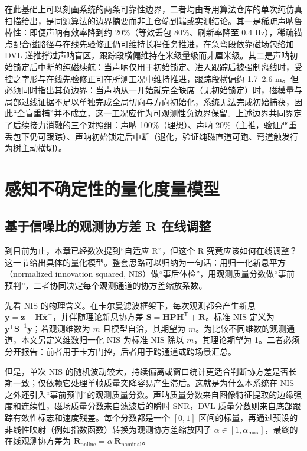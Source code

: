 在此基础上可以刻画系统的两条可靠性边界，二者均由专用算法仓库的单次纯仿真扫描给出，是同源算法的边界摘要而非主仓端到端或实测结论。其一是稀疏声呐鲁棒性：即便声呐有效率降到约 20\%（等效丢包 80\%、刷新率降至 0.4 Hz），稀疏锚点配合磁路径与在线先验修正仍可维持长程任务推进，在急弯段依靠磁场包络加 DVL 递推撑过声呐盲区，跟踪段横偏维持在米级量级而非厘米级。其二是声呐初始锁定后中断的纯磁续航：当声呐仅用于初始锁定、进入跟踪后被强制离线时，受控之字形与在线先验修正可在所测工况中维持推进，跟踪段横偏约 1.7--2.6 m。但必须同时指出其负边界：当声呐从一开始就完全缺席（无初始锁定）时，磁模量与局部过线证据不足以单独完成全局切向与方向初始化，系统无法完成初始捕获，因此``全盲重捕''并不成立，这一工况应作为可观测性负边界保留。上述边界共同界定了后续接力消融的三个对照组：声呐 100\%（理想）、声呐 20\%（主推，验证严重丢包下仍可跟踪）、声呐初始锁定后中断（退化，验证纯磁直道可跑、弯道触发行为树主动横切）。

\section{感知不确定性的量化度量模型}\label{sec:ch03-3-4}

\subsection{基于信噪比的观测协方差 R 在线调整}\label{sec:ch03-3-4-1}

到目前为止，本章已经数次提到``自适应 R''，但这个 R 究竟应该如何在线调整？这一节给出具体的量化模型。整套思路可以归纳为一句话：用归一化新息平方（normalized innovation squared, NIS）做``事后体检''，用观测质量分数做``事前预判''，二者协同决定每个观测通道的协方差缩放系数。

先看 NIS 的物理含义\cite{barshalom2001estimation}。在卡尔曼滤波框架下，每次观测都会产生新息 \(\boldsymbol{y}=\boldsymbol{z}-\boldsymbol{H}\hat{\boldsymbol{x}}^-\)，并伴随理论新息协方差 \(\boldsymbol{S}=\boldsymbol{H}\boldsymbol{P}\boldsymbol{H}^{\mathsf{T}}+\boldsymbol{R}\)。标准 NIS 定义为 \(\boldsymbol{y}^{\mathsf{T}}\boldsymbol{S}^{-1}\boldsymbol{y}\)；若观测维数为 \(m\) 且模型自洽，其期望为 \(m\)。为比较不同维数的观测通道，本文另定义维数归一化 NIS 为标准 NIS 除以 \(m\)，其理论期望为 1。二者必须分开报告：前者用于卡方门控，后者用于跨通道或跨场景汇总。

但是，单次 NIS 的随机波动较大，持续偏离或窗口统计更适合判断协方差是否长期一致；仅依赖它处理单帧质量突降容易产生滞后。这就是为什么本系统在 NIS 之外还引入``事前预判''的观测质量分数。声呐质量分数来自图像特征提取的边缘强度和连续性，磁场质量分数来自滤波后的瞬时 SNR，DVL 质量分数则来自底部跟踪有效性标志和速度残差。每个分数都是一个 \([0,1]\) 区间的标量，再通过预设的非线性映射（例如指数函数）转换为观测协方差缩放因子 \(\alpha \in [1,\alpha_{\max}]\)，最终的在线观测协方差为 \(\boldsymbol{R}_{\mathrm{online}}=\alpha\,\boldsymbol{R}_{\mathrm{nominal}}\)。

